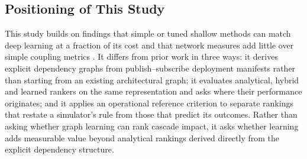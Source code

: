 \subsection{Positioning of This Study}
\label{sec:2.5}

This study builds on findings that simple or tuned shallow methods can match deep learning at a fraction of its cost \cite{hellendoorn2017deep,errica2020fair,fu2017easy,majumder2018faster} and that network measures add little over simple coupling metrics \cite{zimmermann2008predicting,premraj2011network}. It differs from prior work in three ways: it derives explicit dependency graphs from publish--subscribe deployment manifests rather than starting from an existing architectural graph; it evaluates analytical, hybrid and learned rankers on the same representation and asks where their performance originates; and it applies an operational reference criterion to separate rankings that restate a simulator's rule from those that predict its outcomes. Rather than asking whether graph learning can rank cascade impact, it asks whether learning adds measurable value beyond analytical rankings derived directly from the explicit dependency structure.
